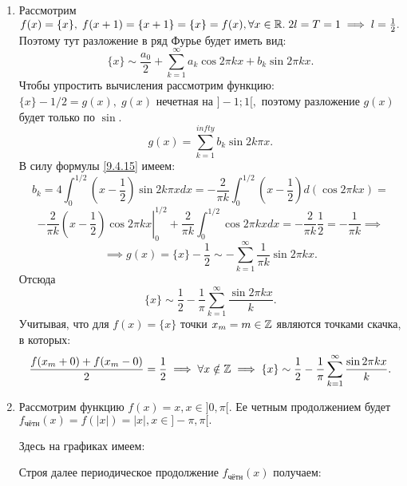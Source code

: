 \documentclass[../../main.tex]{subfiles}
\begin{document}
		\begin{examples}
			\begin{enumerate}
				\item Рассмотрим $f(x) = \{x\}, \; f(x + 1) = \{x+1\} = \{x\} = f(x), \forall x \in \mathbb{R}. \; 2l = T = 1 \implies l = \frac{1}{2}.$
				Поэтому тут разложение в ряд Фурье будет иметь вид:
				\[
					\{x\} \sim \frac{a_0}{2} + \sum_{k=1}^{\infty}  a_k \cos 
					2 \pi k x +
					b_k \sin 2 \pi k x.
				\]
				Чтобы упростить вычисления рассмотрим функцию: $\{x\} - 1/2 = g(x), \; g(x) $ нечетная на $]-1; 1[,$ поэтому разложение $g(x)$ будет только по $\sin.$
				\[
					g(x) = \sum_{k=1}^{infty} b_k \sin 2 k \pi x.
				\] 
				В силу формулы \ref{9.4.15} имеем:
				\[
					b_k = 4 \int_{0}^{1/2} \left(x - \frac{1}{2}\right) \sin 2 k \pi x dx =
					-\frac{2}{\pi k} \int_{0}^{1/2} \left(x - \frac{1}{2}\right)  d (\cos 2 \pi k x) = 
					\]
					\[
					-\frac{2}{\pi k} \left. \left(x - \frac{1}{2}\right) \cos 2 \pi k x \right|_0^{1/2} + \frac{2}{\pi k}  \int_{0}^{1/2} \cos 2 \pi k x dx =
					-\frac{2}{\pi k} \frac{1}{2} = -\frac{1}{\pi k} \implies
				\]
				\[
				\implies
				g(x) = \{x\} - \frac{1}{2} \sim - \sum_{k=1}^{\infty} \frac{1}{\pi k} \sin 2 \pi k x.
				\]
				Отсюда 
				\[
					\{x\} \sim \frac{1}{2}  -\frac{1}{\pi} \sum_{k=1}^{\infty} \frac{\sin 2 \pi k x}{k}.
				\]
				Учитывая, что для $f(x) = \{x\}$ точки $x_m = m \in \mathbb{Z}$ являются точками скачка, в которых:
				\[
					\frac{f(x_m+0) + f(x_m-0)}{2} = \frac{1}{2} \implies 
					\forall x \notin \mathbb{Z} \implies \{x\} \sim \frac{1}{2}  -\frac{1}{\pi} \sum_{k=1}^{\infty} \frac{\sin 2 \pi k x}{k}.
				\]
				\item Рассмотрим функцию $f(x) = x, x \in ]0, \pi[.$ 
				Ее четным продолжением будет $f_{\text{чётн}}(x) = f(|x|) = |x|, x \in ]-\pi, \pi[.$
				
				Здесь на графиках имеем:
				
				Строя далее периодическое продолжение $f_{\text{чётн}}(x)$ получаем:
				

\end{enumerate}
\end{examples}
\end{document}
